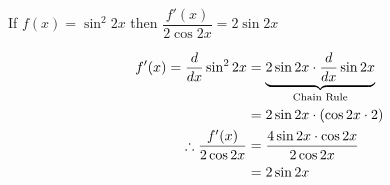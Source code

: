 \documentclass[14pt,fleqn]{extarticle}
\begin{document}
 
\begin{snippet}
    \correct
    
    If $f(x) = \sin^2 2x$ then $\dfrac{f'(x)}{2\cos 2x} = 2\sin 2x$
    
    \reason
    
    \begin{align}
	f'(x) = \frac{d}{dx} \sin^2 2x &= \underbrace{2\sin 2x\cdot \frac{d}{dx}\sin 2x}_{\text{Chain Rule}} \\ 
	&= 2\sin 2x\cdot \left(\cos 2x\cdot 2 \right) \\
	\therefore \frac{f'(x)}{2\cos 2x} &= \frac{4\sin 2x\cdot\cos2x}{2\cos 2x} \\
	&= 2\sin 2x 
\end{align}
    
\end{snippet} 
\end{document}
